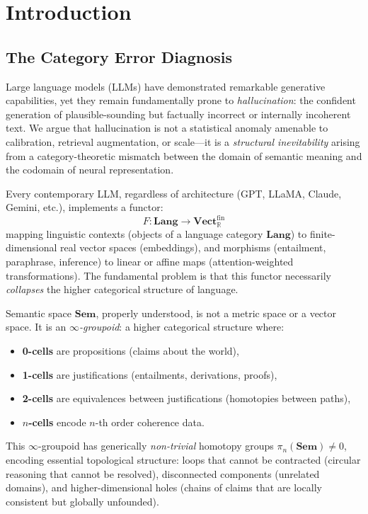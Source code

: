 \documentclass[11pt,a4paper]{article}
\theoremstyle{plain}
\theoremstyle{definition}
\theoremstyle{remark}
\newcommand{\Sem}{\mathbf{Sem}}
\newcommand{\Lang}{\mathbf{Lang}}
\newcommand{\Vect}{\mathbf{Vect}}
\newcommand{\R}{\mathbb{R}}
\begin{document}
\tableofcontents
\newpage

\section{Introduction}
\label{sec:intro}

\subsection{The Category Error Diagnosis}

Large language models (LLMs) have demonstrated remarkable generative capabilities, yet they remain fundamentally prone to \emph{hallucination}: the confident generation of plausible-sounding but factually incorrect or internally incoherent text. We argue that hallucination is not a statistical anomaly amenable to calibration, retrieval augmentation, or scale---it is a \emph{structural inevitability} arising from a category-theoretic mismatch between the domain of semantic meaning and the codomain of neural representation.

Every contemporary LLM, regardless of architecture (GPT, LLaMA, Claude, Gemini, etc.), implements a functor:
\begin{equation}
\label{eq:F}
F: \Lang \to \Vect_{\R}^{\mathrm{fin}}
\end{equation}
mapping linguistic contexts (objects of a language category $\Lang$) to finite-dimensional real vector spaces (embeddings), and morphisms (entailment, paraphrase, inference) to linear or affine maps (attention-weighted transformations). The fundamental problem is that this functor necessarily \emph{collapses} the higher categorical structure of language.

Semantic space $\Sem$, properly understood, is not a metric space or a vector space. It is an \emph{$\infty$-groupoid}: a higher categorical structure where:
\begin{itemize}[nosep]
  \item \textbf{0-cells} are propositions (claims about the world),
  \item \textbf{1-cells} are justifications (entailments, derivations, proofs),
  \item \textbf{2-cells} are equivalences between justifications (homotopies between paths),
  \item \textbf{$n$-cells} encode $n$-th order coherence data.
\end{itemize}
This $\infty$-groupoid has generically \emph{non-trivial} homotopy groups $\pi_n(\Sem) \neq 0$, encoding essential topological structure: loops that cannot be contracted (circular reasoning that cannot be resolved), disconnected components (unrelated domains), and higher-dimensional holes (chains of claims that are locally consistent but globally unfounded).
\end{document}
